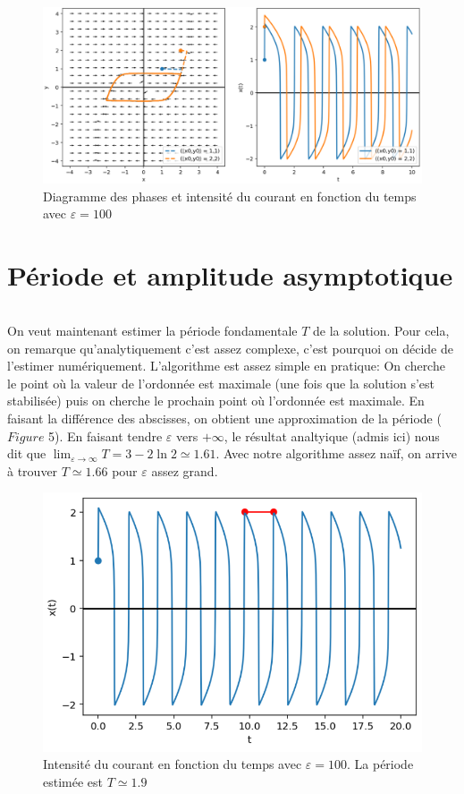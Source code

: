 \documentclass{article}
\begin{document}
\begin{figure}[!h]
    \centering
    \includegraphics[scale=0.4]{../images/epsilon_choice.png}
    \captionsetup{justification=centering,margin=2cm}
    \caption{Diagramme des phases et intensité du courant en fonction du temps avec $\varepsilon = 100$}
\end{figure}

\section{Période et amplitude asymptotique}

\[\]

On veut maintenant estimer la période fondamentale $T$ de la solution. Pour cela, on remarque qu'analytiquement c'est assez complexe, c'est pourquoi on décide de l'estimer numériquement.
L'algorithme est assez simple en pratique: On cherche le point où la valeur de l'ordonnée est maximale (une fois que la solution s'est stabilisée) puis on cherche le prochain point où l'ordonnée est maximale.
En faisant la différence des abscisses, on obtient une approximation de la période ($Figure$ 5).
En faisant tendre $\varepsilon$ vers $+\infty $, le résultat analtyique (admis ici) nous dit que $\lim_{\varepsilon \to \infty} T = 3 - 2\ln 2 \simeq 1.61$.
Avec notre algorithme assez naïf, on arrive à trouver $T \simeq 1.66$ pour $\varepsilon$ assez grand.

\begin{figure}[!h]
    \centering
    \includegraphics[scale=0.5]{../images/periode.png}
    \captionsetup{justification=centering,margin=2cm}
    \caption{Intensité du courant en fonction du temps avec $\varepsilon = 100$. La période estimée est $T \simeq 1.9$}
\end{figure}
\end{document}
